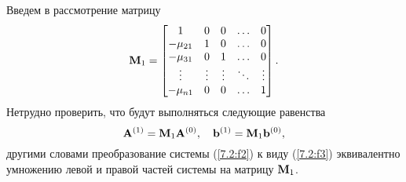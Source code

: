 \documentclass[12pt]{article}
\begin{document}
    Введем в рассмотрение матрицу
    \begin{equation}
        \bold{M}_1=\begin{bmatrix}
            1 & 0 & 0 & \ldots & 0 \\
            -\mu_{21} & 1 & 0 & \ldots & 0 \\
            -\mu_{31} & 0 & 1 & \ldots & 0 \\
             \vdots & \vdots & \vdots & \ddots & \vdots \\
             -\mu_{n1} & 0 & 0 & \ldots & 1
        \end{bmatrix}.
    \end{equation}
    Нетрудно проверить, что будут выполняться следующие равенства
    \begin{equation}
        \bold{A}^{\left(1\right)}=\bold{M}_1\bold{A}^{\left(0\right)},\quad \bold{b}^{\left(1\right)}=\bold{M}_1 \bold{b}^{\left(0\right)},
    \end{equation}
    другими словами преобразование системы (\ref{7.2:f2}) к виду (\ref{7.2:f3}) эквивалентно умножению левой и правой частей системы на матрицу $\bold{M}_1$.
\end{document}

